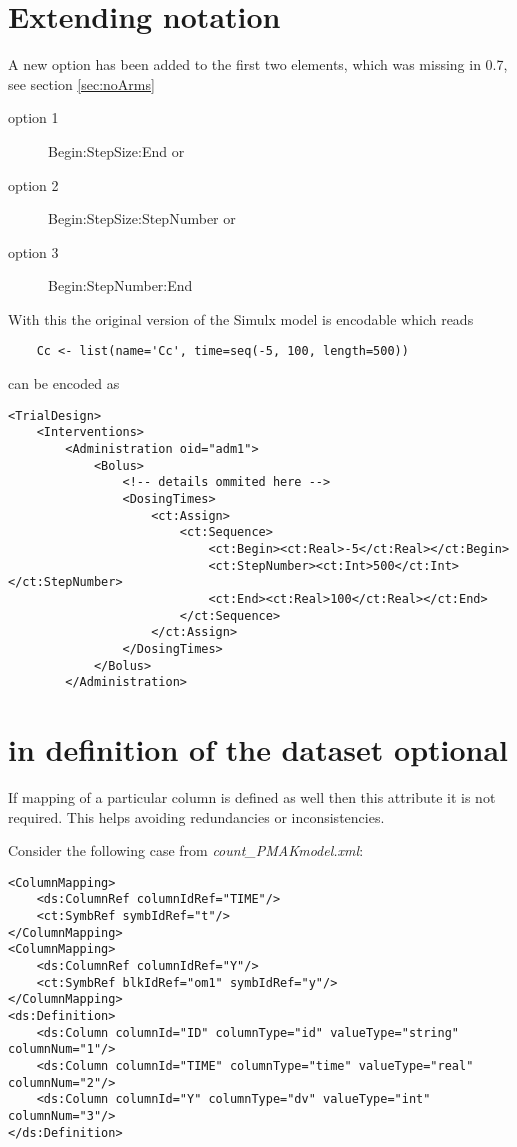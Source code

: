 \section{Extending  notation}
A new option has been added to the first two elements, which was
missing in 0.7, see section \ref{sec:noArms}
\begin{description}
\item[option 1]
Begin:StepSize:End or
\item[option 2] 
Begin:StepSize:StepNumber or
\item[option 3]
Begin:StepNumber:End
\end{description}

With this the original version of the Simulx model is encodable which reads
\lstset{language=MLX}
\begin{lstlisting}
	Cc <- list(name='Cc', time=seq(-5, 100, length=500))
\end{lstlisting}
can be encoded as 
\lstset{language=XML}
\begin{lstlisting}
<TrialDesign>
    <Interventions>
        <Administration oid="adm1">
            <Bolus>
                <!-- details ommited here -->
                <DosingTimes>
                    <ct:Assign>
                        <ct:Sequence>
                            <ct:Begin><ct:Real>-5</ct:Real></ct:Begin>
                            <ct:StepNumber><ct:Int>500</ct:Int></ct:StepNumber>
                            <ct:End><ct:Real>100</ct:Real></ct:End>
                        </ct:Sequence>
                    </ct:Assign>
                </DosingTimes>
            </Bolus>
        </Administration>
\end{lstlisting}


\section{ in definition of the dataset optional}
If mapping of a particular column is defined as well then this 
attribute it is not required. This helps avoiding redundancies or inconsistencies.

Consider the following case from \emph{count\_PMAKmodel.xml}:
\lstset{language=XML}
\begin{lstlisting}
<ColumnMapping>
    <ds:ColumnRef columnIdRef="TIME"/>
    <ct:SymbRef symbIdRef="t"/>
</ColumnMapping>
<ColumnMapping>
    <ds:ColumnRef columnIdRef="Y"/>
    <ct:SymbRef blkIdRef="om1" symbIdRef="y"/>
</ColumnMapping>
<ds:Definition>
    <ds:Column columnId="ID" columnType="id" valueType="string" columnNum="1"/>
    <ds:Column columnId="TIME" columnType="time" valueType="real" columnNum="2"/>
    <ds:Column columnId="Y" columnType="dv" valueType="int" columnNum="3"/>
</ds:Definition>
\end{lstlisting}















